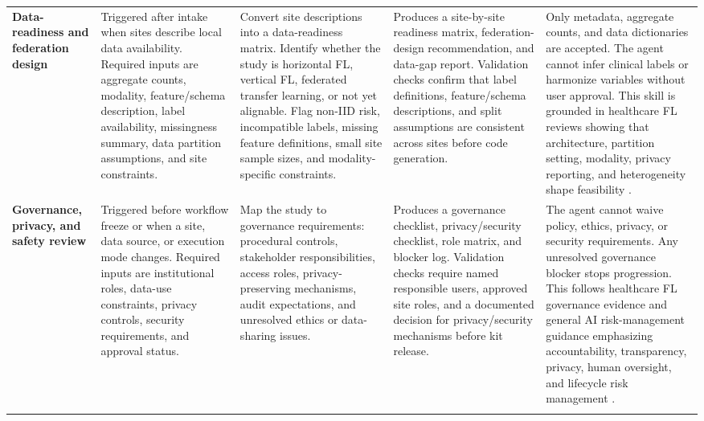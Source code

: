 \documentclass[preprint,5p, 10pt, times]{elsarticle}
\begin{document}
\begin{table}[t]
\begin{tabularx}{\textwidth}{
>{\raggedright\arraybackslash}p{2.4cm}
>{\raggedright\arraybackslash}p{2.7cm}
>{\raggedright\arraybackslash}X
>{\raggedright\arraybackslash}X
>{\raggedright\arraybackslash}X}
\textbf{Data-readiness and federation design}
& Triggered after intake when sites describe local data availability. Required inputs are aggregate counts, modality, feature/schema description, label availability, missingness summary, data partition assumptions, and site constraints.
& Convert site descriptions into a data-readiness matrix. Identify whether the study is horizontal FL, vertical FL, federated transfer learning, or not yet alignable. Flag non-IID risk, incompatible labels, missing feature definitions, small site sample sizes, and modality-specific constraints.
& Produces a site-by-site readiness matrix, federation-design recommendation, and data-gap report. Validation checks confirm that label definitions, feature/schema descriptions, and split assumptions are consistent across sites before code generation.
& Only metadata, aggregate counts, and data dictionaries are accepted. The agent cannot infer clinical labels or harmonize variables without user approval. This skill is grounded in healthcare FL reviews showing that architecture, partition setting, modality, privacy reporting, and heterogeneity shape feasibility \cite{teo2024federated,guan2024federated,chai2024survey}. \\
\addlinespace[3pt]

\textbf{Governance, privacy, and safety review}
& Triggered before workflow freeze or when a site, data source, or execution mode changes. Required inputs are institutional roles, data-use constraints, privacy controls, security requirements, and approval status.
& Map the study to governance requirements: procedural controls, stakeholder responsibilities, access roles, privacy-preserving mechanisms, audit expectations, and unresolved ethics or data-sharing issues.
& Produces a governance checklist, privacy/security checklist, role matrix, and blocker log. Validation checks require named responsible users, approved site roles, and a documented decision for privacy/security mechanisms before kit release.
& The agent cannot waive policy, ethics, privacy, or security requirements. Any unresolved governance blocker stops progression. This follows healthcare FL governance evidence and general AI risk-management guidance emphasizing accountability, transparency, privacy, human oversight, and lifecycle risk management \cite{eden2025scoping,who2021ethicsaihealth,nist2023airmf,jimenez2026security,zhao2025federation}. \\
\addlinespace[3pt]


\end{tabularx}
\end{table}
\end{document}
